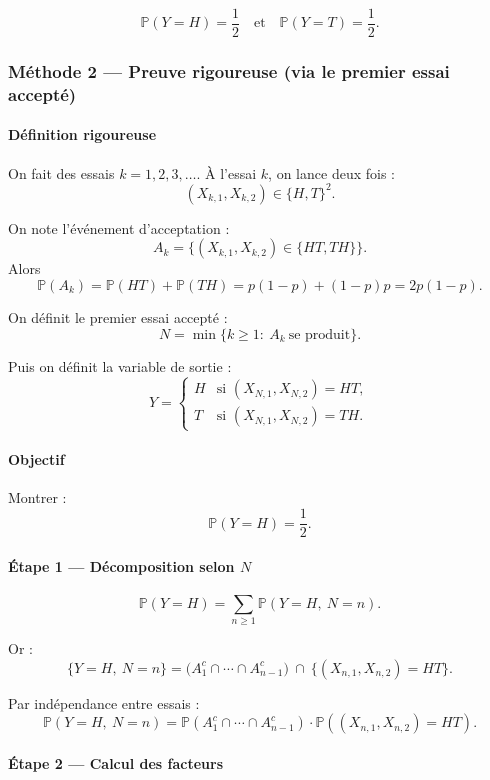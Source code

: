 \[
\boxed{\mathbb{P}(Y=H)=\frac12 \quad\text{et}\quad \mathbb{P}(Y=T)=\frac12.}
\]

\subsubsection*{Méthode 2 — Preuve rigoureuse (via le premier essai accepté)}

\paragraph{Définition rigoureuse}

On fait des essais $k=1,2,3,\dots$.  
À l'essai $k$, on lance deux fois :
\[
(X_{k,1},X_{k,2})\in\{H,T\}^2.
\]

On note l'événement d'acceptation :
\[
A_k=\{(X_{k,1},X_{k,2})\in\{HT,TH\}\}.
\]
Alors
\[
\mathbb{P}(A_k)=\mathbb{P}(HT)+\mathbb{P}(TH)=p(1-p)+(1-p)p=2p(1-p).
\]

On définit le premier essai accepté :
\[
N=\min\{k\ge 1:\ A_k\ \text{se produit}\}.
\]

Puis on définit la variable de sortie :
\[
Y=
\begin{cases}
H & \text{si } (X_{N,1},X_{N,2})=HT,\\
T & \text{si } (X_{N,1},X_{N,2})=TH.
\end{cases}
\]

\paragraph{Objectif}
Montrer :
\[
\mathbb{P}(Y=H)=\frac12.
\]

\paragraph{Étape 1 — Décomposition selon $N$}

\[
\mathbb{P}(Y=H)=\sum_{n\ge 1}\mathbb{P}(Y=H,\ N=n).
\]

Or :
\[
\{Y=H,\ N=n\}
=
\big(A_1^c\cap\cdots\cap A_{n-1}^c\big)\ \cap\ \{(X_{n,1},X_{n,2})=HT\}.
\]

Par indépendance entre essais :
\[
\mathbb{P}(Y=H,\ N=n)=\mathbb{P}(A_1^c\cap\cdots\cap A_{n-1}^c)\cdot \mathbb{P}((X_{n,1},X_{n,2})=HT).
\]

\paragraph{Étape 2 — Calcul des facteurs}

